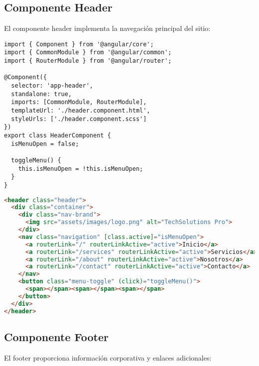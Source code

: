 \subsection{Componente Header}

El componente header implementa la navegación principal del sitio:

\begin{lstlisting}[caption=Header Component - TypeScript]
import { Component } from '@angular/core';
import { CommonModule } from '@angular/common';
import { RouterModule } from '@angular/router';

@Component({
  selector: 'app-header',
  standalone: true,
  imports: [CommonModule, RouterModule],
  templateUrl: './header.component.html',
  styleUrls: ['./header.component.scss']
})
export class HeaderComponent {
  isMenuOpen = false;
  
  toggleMenu() {
    this.isMenuOpen = !this.isMenuOpen;
  }
}
\end{lstlisting}

\begin{lstlisting}[language=html, caption=Header Component - Template]
<header class="header">
  <div class="container">
    <div class="nav-brand">
      <img src="assets/images/logo.png" alt="TechSolutions Pro">
    </div>
    <nav class="navigation" [class.active]="isMenuOpen">
      <a routerLink="/" routerLinkActive="active">Inicio</a>
      <a routerLink="/services" routerLinkActive="active">Servicios</a>
      <a routerLink="/about" routerLinkActive="active">Nosotros</a>
      <a routerLink="/contact" routerLinkActive="active">Contacto</a>
    </nav>
    <button class="menu-toggle" (click)="toggleMenu()">
      <span></span><span></span><span></span>
    </button>
  </div>
</header>
\end{lstlisting}

\subsection{Componente Footer}

El footer proporciona información corporativa y enlaces adicionales:


